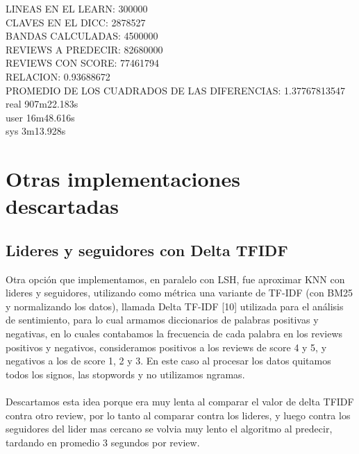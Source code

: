 \documentclass[a4paper,10pt]{article}
\begin{document}
	
	LINEAS EN EL LEARN: 300000\\
	CLAVES EN EL DICC: 2878527\\
	BANDAS CALCULADAS: 4500000\\
	REVIEWS A PREDECIR: 82680000\\
	REVIEWS CON SCORE: 77461794\\
	RELACION: 0.93688672\\
	PROMEDIO DE LOS CUADRADOS DE LAS DIFERENCIAS: 1.37767813547\\
	real	907m22.183s\\
	user	16m48.616s\\
	sys	3m13.928s\\
	
	
	\section{Otras implementaciones descartadas}
	
	\subsection{Lideres y seguidores con Delta TFIDF}

	Otra opci\'{o}n que implementamos, en paralelo con LSH, fue aproximar KNN con lideres y seguidores, utilizando como m\'{e}trica una variante de TF-IDF (con BM25 y normalizando los datos), llamada Delta TF-IDF [10] utilizada para el an\'{a}lisis de sentimiento, para lo cual armamos diccionarios de palabras positivas y negativas, en lo cuales contabamos la frecuencia de cada palabra en los reviews positivos y negativos, consideramos positivos a los reviews de score 4 y 5, y negativos a los de score 1, 2 y 3. En este caso al procesar los datos quitamos todos los signos, las stopwords y no utilizamos ngramas. \\ \\
	 Descartamos esta idea porque era muy lenta al comparar el valor de delta TFIDF contra otro review, por lo tanto al comparar contra los lideres, y luego contra los seguidores del lider mas cercano se volvia muy lento el algoritmo al predecir, tardando en promedio 3 segundos por review.
	
	
	
\end{document}
